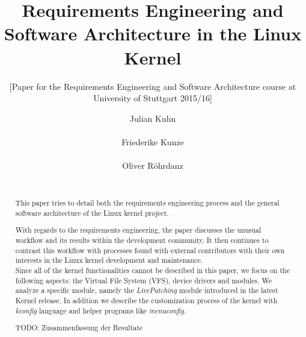 \documentclass{sig-alternate-05-2015}
\begin{document}
\title{Requirements Engineering and Software Architecture in the Linux Kernel}
\subtitle{[Paper for the Requirements Engineering and Software Architecture course at University of Stuttgart 2015/16]}

\author{
    \alignauthor Julian Kuhn\\
        \\
    \alignauthor Friederike Kunze\\
        \\
    \alignauthor Oliver R{\"o}hrdanz\\
        \\
}

\maketitle

\begin{abstract}

This paper tries to detail both the requirements engineering process and the general software architecture of the Linux kernel project.

With regards to the requirements engineering, the paper discusses the unusual workflow and its results within the development community.
It then continues to contrast this workflow with processes found with external contributors with their own interests in the Linux kernel development and maintenance.\\
Since all of the kernel functionalities cannot be described in this paper, we focus on the following aspects: the Virtual File System (VFS), device drivers and modules. We analyze a specific module, namely the \emph{LivePatching} module introduced in the latest Kernel release. In addition we describe the customization process of the kernel with \emph{kconfig} language and helper programs like \emph{menuconfig}.

TODO: Zusammenfassung der Resultate

\end{abstract}
\end{document}
